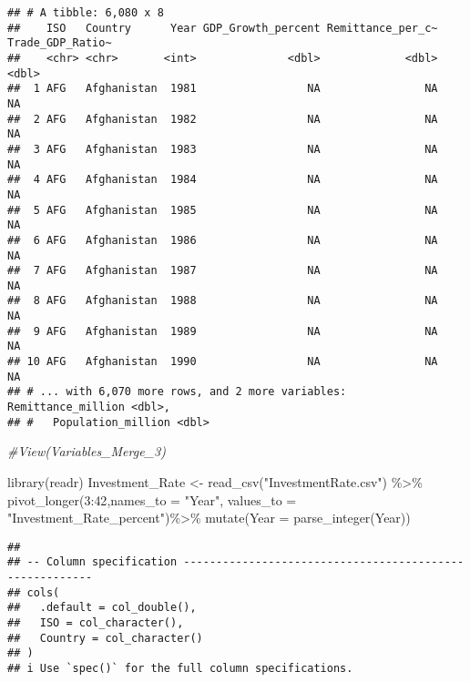 \documentclass[
]{article}
\newenvironment{Shaded}{\begin{snugshade}}{\end{snugshade}}
\newcommand{\AttributeTok}[1]{\textcolor[rgb]{0.77,0.63,0.00}{#1}}
\newcommand{\CommentTok}[1]{\textcolor[rgb]{0.56,0.35,0.01}{\textit{#1}}}
\newcommand{\DecValTok}[1]{\textcolor[rgb]{0.00,0.00,0.81}{#1}}
\newcommand{\FunctionTok}[1]{\textcolor[rgb]{0.00,0.00,0.00}{#1}}
\newcommand{\NormalTok}[1]{#1}
\newcommand{\OtherTok}[1]{\textcolor[rgb]{0.56,0.35,0.01}{#1}}
\newcommand{\SpecialCharTok}[1]{\textcolor[rgb]{0.00,0.00,0.00}{#1}}
\newcommand{\StringTok}[1]{\textcolor[rgb]{0.31,0.60,0.02}{#1}}
\begin{document}
\begin{verbatim}
## # A tibble: 6,080 x 8
##    ISO   Country      Year GDP_Growth_percent Remittance_per_c~ Trade_GDP_Ratio~
##    <chr> <chr>       <int>              <dbl>             <dbl>            <dbl>
##  1 AFG   Afghanistan  1981                 NA                NA               NA
##  2 AFG   Afghanistan  1982                 NA                NA               NA
##  3 AFG   Afghanistan  1983                 NA                NA               NA
##  4 AFG   Afghanistan  1984                 NA                NA               NA
##  5 AFG   Afghanistan  1985                 NA                NA               NA
##  6 AFG   Afghanistan  1986                 NA                NA               NA
##  7 AFG   Afghanistan  1987                 NA                NA               NA
##  8 AFG   Afghanistan  1988                 NA                NA               NA
##  9 AFG   Afghanistan  1989                 NA                NA               NA
## 10 AFG   Afghanistan  1990                 NA                NA               NA
## # ... with 6,070 more rows, and 2 more variables: Remittance_million <dbl>,
## #   Population_million <dbl>
\end{verbatim}

\begin{Shaded}
\begin{Highlighting}[]
\CommentTok{\#View(Variables\_Merge\_3)}
\end{Highlighting}
\end{Shaded}

\begin{Shaded}
\begin{Highlighting}[]
\FunctionTok{library}\NormalTok{(readr)}
\NormalTok{Investment\_Rate }\OtherTok{\textless{}{-}} \FunctionTok{read\_csv}\NormalTok{(}\StringTok{"InvestmentRate.csv"}\NormalTok{) }\SpecialCharTok{\%\textgreater{}\%}
  \FunctionTok{pivot\_longer}\NormalTok{(}\DecValTok{3}\SpecialCharTok{:}\DecValTok{42}\NormalTok{,}\AttributeTok{names\_to =} \StringTok{"Year"}\NormalTok{, }\AttributeTok{values\_to =} \StringTok{"Investment\_Rate\_percent"}\NormalTok{)}\SpecialCharTok{\%\textgreater{}\%}
  \FunctionTok{mutate}\NormalTok{(}\AttributeTok{Year =} \FunctionTok{parse\_integer}\NormalTok{(Year))}
\end{Highlighting}
\end{Shaded}

\begin{verbatim}
## 
## -- Column specification --------------------------------------------------------
## cols(
##   .default = col_double(),
##   ISO = col_character(),
##   Country = col_character()
## )
## i Use `spec()` for the full column specifications.
\end{verbatim}
\end{document}
